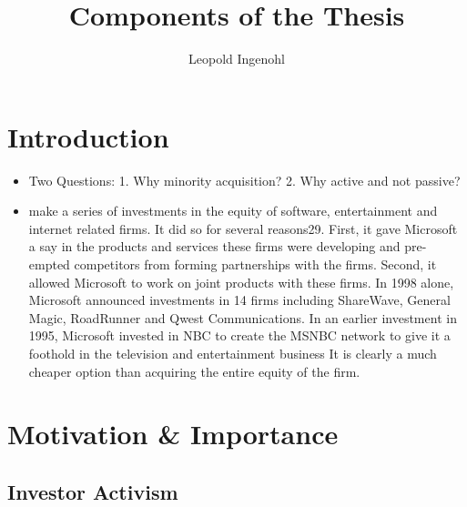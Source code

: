 \documentclass[12pt]{article}
\title{Components of the Thesis}
\author{Leopold Ingenohl}
\begin{document}
\maketitle

\pagebreak

\tableofcontents

\pagebreak

\section{Introduction}

\begin{itemize}
    \item Two Questions: 1. Why minority acquisition? 2. Why active and not passive? 
    \item make a series of investments in the equity of software, entertainment and internet related firms. It did so for several reasons29. First, it gave Microsoft a say in the products and services these firms were developing and pre-empted competitors from forming partnerships with the firms. Second, it allowed Microsoft to work on joint products with these firms. In 1998 alone, Microsoft announced investments in 14 firms including ShareWave, General Magic, RoadRunner and Qwest Communications. In an earlier investment in 1995, Microsoft invested in NBC to create the MSNBC network to give it a foothold in the television and entertainment business \citep{Damodaran2005} It is clearly a much cheaper option than acquiring the entire equity of the firm.
\end{itemize}

\section{Motivation \& Importance} 

\subsection{Investor Activism}
\end{document}
